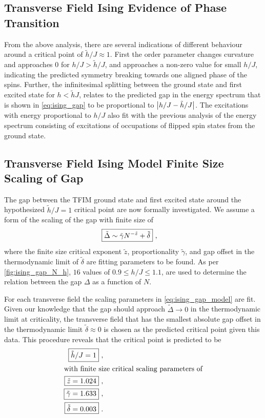 \documentclass[12pt]{article}{}
\begin{document}
\subsection{Transverse Field Ising Evidence of Phase Transition}
From the above analysis, there are several indications of different behaviour around a critical point of $\tilde{h}/J \approx 1$. First the order parameter changes curvature and approaches $0$ for $h/J > \tilde{h}/J$, and approaches a non-zero value for small $h/J$, indicating the predicted symmetry breaking towards one aligned phase of the spins. Further, the infinitesimal splitting between the ground state and first excited state for $h < \tilde{h}{J}$, relates to the predicted gap in the energy spectrum that is shown in \cref{eq:ising_gap} to be proportional to $\abs{h/J - \tilde{h}/J}$. The excitations with energy proportional to $h/J$ also fit with the previous analysis of the energy spectrum consisting of excitations of occupations of flipped spin states from the ground state.

\subsection{Transverse Field Ising Model Finite Size Scaling of Gap}
The gap between the TFIM ground state and first excited state around the hypothesized $\tilde{h}/J = 1$ critical point are now formally investigated. We assume a form of the scaling of the gap with finite size of
\begin{align}
  \Aboxed{\tilde{\Delta} \sim \tilde{\gamma}N^{-\tilde{z}} + \tilde{\delta}}~, \label{eq:ising_gap_model}
\end{align}
where the finite size critical exponent $\tilde{z}$, proportionality $\tilde{\gamma}$, and gap offset in the thermodynamic limit of $\tilde{\delta}$ are fitting parameters to be found. As per \cref{fig:ising_gap_N_h}, $16$ values of $0.9 \leq h/J \leq 1.1$, are used to determine the relation between the gap $\Delta$ as a function of $N$. 

For each transverse field the scaling parameters in \cref{eq:ising_gap_model} are fit. Given our knowledge that the gap should approach $\tilde{\Delta} \to 0$ in the thermodynamic limit at criticality, the transverse field that has the smallest absolute gap offset in the thermodynamic limit $\tilde{\delta} \approx 0$ is chosen as the predicted critical point given this data. This procedure reveals that the critical point is predicted to be
\begin{align}
  \Aboxed{\tilde{h}/J = 1}~, \label{eq:ising_criticalpt} \\
  \intertext{with finite size critical scaling parameters of}
  \Aboxed{\tilde{z} = 1.024}~, \\
  \Aboxed{\tilde{\gamma} = 1.633}~, \\
  \Aboxed{\tilde{\delta} = 0.003}~. 
\end{align}
\end{document}
